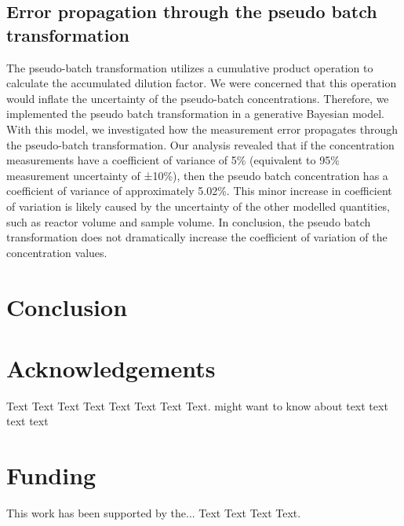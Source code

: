 \documentclass{bioinfo}
\begin{document}
\subsection{Error propagation through the pseudo batch transformation}
The pseudo-batch transformation utilizes a cumulative product operation to calculate the accumulated dilution factor. We were concerned that this operation would inflate the uncertainty of the pseudo-batch concentrations. Therefore, we implemented the pseudo batch transformation in a generative Bayesian model. With this model, we investigated how the measurement error propagates through the pseudo-batch transformation. Our analysis revealed that if the concentration measurements have a coefficient of variance of 5\% (equivalent to 95\% measurement uncertainty of ±10\%), then the pseudo batch concentration has a coefficient of variance of approximately 5.02\%. This minor increase in coefficient of variation is likely caused by the uncertainty of the other modelled quantities, such as reactor volume and sample volume. In conclusion, the pseudo batch transformation does not dramatically increase the coefficient of variation of the concentration values.

\section{Conclusion}


\section*{Acknowledgements}

Text Text Text Text Text Text  Text Text.  \citealp{Boffelli03} might want to know about  text
text text text\vspace*{-12pt}

\section*{Funding}

This work has been supported by the... Text Text  Text Text.\vspace*{-12pt}



\end{document}
